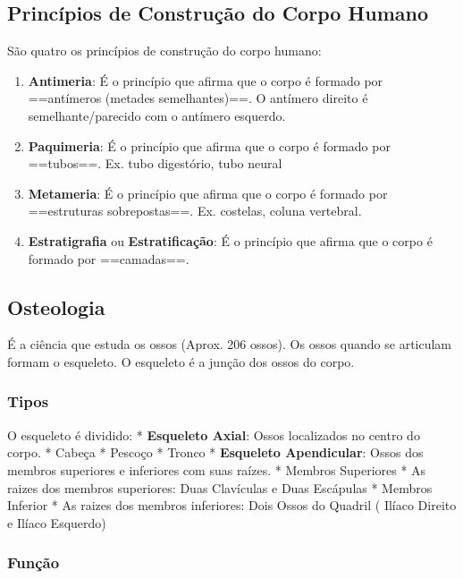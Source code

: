 \documentclass[
]{book}
\providecommand{\tightlist}{%
  \setlength{\itemsep}{0pt}\setlength{\parskip}{0pt}}
\begin{document}
\hypertarget{princuxedpios-de-construuxe7uxe3o-do-corpo-humano}{%
\subsection{Princípios de Construção do Corpo Humano}\label{princuxedpios-de-construuxe7uxe3o-do-corpo-humano}}

São quatro os princípios de construção do corpo humano:

\begin{enumerate}
\def\labelenumi{\arabic{enumi}.}
\tightlist
\item
  \textbf{Antimeria}: É o princípio que afirma que o corpo é formado por ==antímeros (metades semelhantes)==. O antímero direito é semelhante/parecido com o antímero esquerdo.
\item
  \textbf{Paquimeria}: É o princípio que afirma que o corpo é formado por ==tubos==. Ex. tubo digestório, tubo neural
\item
  \textbf{Metameria}: É o princípio que afirma que o corpo é formado por ==estruturas sobrepostas==. Ex. costelas, coluna vertebral.
\item
  \textbf{Estratigrafia} ou \textbf{Estratificação}: É o princípio que afirma que o corpo é formado por ==camadas==.
\end{enumerate}

\hypertarget{osteologia}{%
\subsection{Osteologia}\label{osteologia}}

É a ciência que estuda os ossos (Aprox. 206 ossos). Os ossos quando se articulam formam o esqueleto. O esqueleto é a junção dos ossos do corpo.

\hypertarget{tipos}{%
\subsubsection{Tipos}\label{tipos}}

O esqueleto é dividido:
* \textbf{Esqueleto Axial}: Ossos localizados no centro do corpo.
* Cabeça
* Pescoço
* Tronco
* \textbf{Esqueleto Apendicular}: Ossos dos membros superiores e inferiores com suas raízes.
* Membros Superiores
* As raizes dos membros superiores: Duas Clavículas e Duas Escápulas
* Membros Inferior
* As raizes dos membros inferiores: Dois Ossos do Quadril ( Ilíaco Direito e Ilíaco Esquerdo)

\hypertarget{funuxe7uxe3o}{%
\subsubsection{Função}\label{funuxe7uxe3o}}
\end{document}
